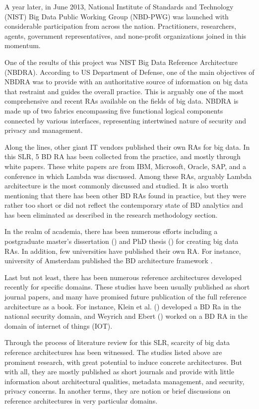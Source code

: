 \documentclass[review]{elsarticle}
\begin{document}
A year later, in June 2013, National Institute of Standards and Technology (NIST) Big Data Public Working Group (NBD-PWG) was launched with considerable participation from across the nation. Practitioners, researchers, agents, government representatives, and none-profit organizations joined in this momentum.

One of the results of this project was NIST Big Data Reference Architecture (NBDRA). According to US Department of Defense, one of the main objectives of NBDRA was to provide with an authoritative source of information on big data that restraint and guides the overall practice. This is arguably one of the most comprehensive and recent RAs available on the fields of big data. NBDRA is made up of two fabrics encompassing five functional logical components connected by various interfaces, representing intertwined nature of security and privacy and management.

Along the lines, other giant IT vendors published their own RAs for big data. In this SLR, 5 BD RA has been collected from the practice, and mostly through white papers. These white papers are from IBM, Microsoft, Oracle, SAP, and a conference in which Lambda was discussed. Among these RAs, arguably Lambda architecture is the most commonly discussed and studied. It is also worth mentioning that there has been other BD RAs found in practice, but they were rather too short or did not reflect the contemporary state of BD analytics and has been eliminated as described in the research methodology section.

In the realm of academia, there has been numerous efforts including a postgraduate master’s dissertation (\cite{Maier}) and PhD thesis (\cite{suthakar2017scalable}) for creating big data RAs. In addition, few universities have published their own RA. For instance, university of Amsterdam published the BD architecture framework \cite{framework2015draft}. 

Last but not least, there has been numerous reference architectures developed recently for specific domains. These studies have been usually published as short journal papers, and many have promised future publication of the full reference architecture as a book. For instance, Klein et al. (\cite{Klein}) developed a BD Ra in the national security domain, and Weyrich and Ebert (\cite{weyrich2015reference}) worked on a BD RA in the domain of internet of things (IOT). 

Through the process of literature review for this SLR, scarcity of big data reference architectures has been witnessed. The studies listed above are prominent research, with great potential to induce concrete architectures. But with all, they are mostly published as short journals and provide with little information about architectural qualities, metadata management, and security, privacy concerns. In another terms, they are notion or brief discussions on reference architectures in very particular domains.
\end{document}
